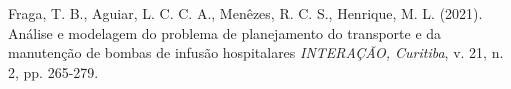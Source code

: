 \documentclass[preprint,12pt,authoryear]{elsarticle}
\begin{document}


\begin{thebibliography}{00}


Fraga, T. B., Aguiar, L. C. C. A., Menêzes, R. C. S., Henrique, M. L. (2021). Análise e modelagem do problema de planejamento do transporte e da manutenção de bombas de infusão hospitalares \emph{INTERAÇÃO, Curitiba}, v. 21, n. 2, pp. 265-279.

\end{thebibliography}
\end{document}
